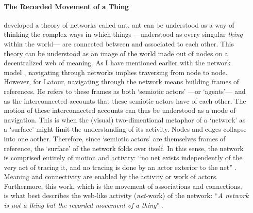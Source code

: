 


\paragraph{The Recorded Movement of a Thing}
\textcite{Lat90:On, Lat93:We} developed a theory of networks called \gls{ant}. \gls{ant} can be understood as a way of thinking the complex ways in which things ---understood as every singular \textit{thing} within the world--- are connected between and associated to each other. This theory can be understood as an image of the world made out of nodes on a decentralized web of meaning. As I have mentioned earlier with the network model , navigating through networks implies traversing from node to node. However, for Latour, navigating through the network means building frames of references. He refers to these frames as both `semiotic actors' ---or `agents'--- and as the interconnected accounts that these semiotic actors have of each other. The motion of these interconnected accounts can thus be understood as a mode of navigation. This is when the (visual) two-dimentional metaphor of a `network' as a `surface' might limit the understanding of its activity. Nodes and edges collapse into one aother. Therefore, since `semiotic actors' are themselves frames of reference, the `surface' of the network folds over itself. In this sense, the network is comprised entirely of motion and activity: ``no net exists independently of the very act of tracing it, and no tracing is done by an actor exterior to the net'' \parencite[14]{Lat90:On}. Meaning and connectivity are enabled by the activity or work of actors. Furthermore, this work, which is the movement of associations and connections, is what best describes the web-like activity (\textit{net}-work) of the network: ``\textit{A network is not a thing but the recorded movement of a thing}'' \im \parencite[14]{Lat90:On}.
 
